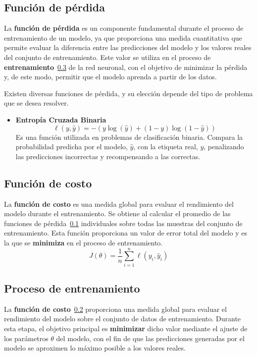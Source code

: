 
\subsection{Función de pérdida}
\label{subsec:funcion_perdida}
La \textbf{función de pérdida} es un componente fundamental durante el proceso de entrenamiento de un modelo, ya que proporciona una medida cuantitativa que permite evaluar la diferencia entre las predicciones del modelo y los valores reales del conjunto de entrenamiento. Este valor se utiliza en el proceso de \textbf{entrenamiento}~\ref{subsec:entrenamiento} de la red neuronal, con el objetivo de minimizar la pérdida y, de este modo, permitir que el modelo aprenda a partir de los datos.

Existen diversas funciones de pérdida, y su elección depende del tipo de problema que se desea resolver.
\begin{itemize}
    \item \textbf{Entropía Cruzada Binaria}
        \[\ell(y, \hat{y}) = -(y \log(\hat{y}) + (1 - y) \log(1 - \hat{y}))\]
       Es una función utilizada en problemas de clasificación binaria. Compara la probabilidad predicha por el modelo, \(\hat{y}\), con la etiqueta real, \(y\), penalizando las predicciones incorrectas y recompensando a las correctas.
\end{itemize}

\subsection{Función de costo}
\label{subsec:funcion_costo}
La \textbf{función de costo} es una medida global para evaluar el rendimiento del modelo durante el entrenamiento. Se obtiene al calcular el promedio de las funciones de pérdida~\ref{subsec:funcion_perdida} individuales sobre todas las muestras del conjunto de entrenamiento. Esta función proporciona un valor de error total del modelo y es la que se \textbf{minimiza} en el proceso de entrenamiento.
\[J(\theta) = \frac{1}{n} \sum_{i=1}^{n} \ell(y_i, \hat{y}_i)\]

\subsection{Proceso de entrenamiento}
\label{subsec:entrenamiento}
La \textbf{función de costo}~\ref{subsec:funcion_costo} proporciona una medida global para evaluar el rendimiento del modelo sobre el conjunto de datos de entrenamiento. Durante esta etapa, el objetivo principal es \textbf{minimizar} dicho valor mediante el ajuste de los parámetros \(\theta\) del modelo, con el fin de que las predicciones generadas por el modelo se aproximen lo máximo posible a los valores reales.

